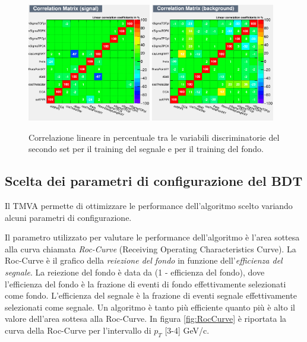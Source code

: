     \begin{figure}
       \centering
       \includegraphics[width=0.48\textwidth]{training&testing/CorrelationMatrixS.png}
        \includegraphics[width=0.48\textwidth]{training&testing/CorrelationMatrixB.png}
       \caption{Correlazione lineare in percentuale tra le variabili discriminatorie del secondo set per il training del segnale e per il training del fondo.}
       \label{fig:CorrelazioneF}
   \end{figure}
    
    

\subsection{Scelta dei parametri di configurazione del BDT}
Il TMVA permette di ottimizzare le performance dell'algoritmo scelto variando alcuni parametri di configurazione.

Il parametro utilizzato per valutare le performance dell'algoritmo \`e l'area sottesa alla curva chiamata \textit{Roc-Curve} (Receiving Operating Characteristics Curve). La Roc-Curve è il grafico della \textit{reiezione del fondo} in funzione dell'\textit{efficienza del segnale}. La reiezione del fondo è data da (1  -  efficienza del fondo), dove l'efficienza del fondo è la frazione di eventi di fondo effettivamente selezionati come fondo. L'efficienza del segnale è la frazione di eventi segnale effettivamente selezionati come segnale. Un algoritmo è tanto più efficiente quanto più è alto il valore dell'area sottesa alla Roc-Curve.  In figura \ref{fig:RocCurve} è riportata la curva della Roc-Curve per l'intervallo di $p_T$ [3-4] GeV/c. 

